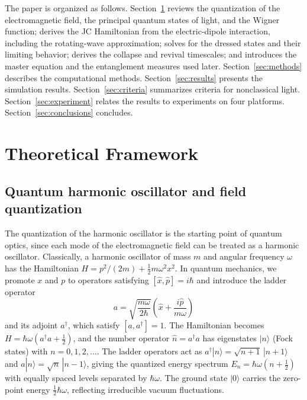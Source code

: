 \documentclass[%
 reprint,
 amsmath,amssymb,
 aps,
 floatfix,
]{revtex4-2}
\begin{document}
The paper is organized as follows. Section~\ref{sec:theory} reviews the quantization of the electromagnetic field, the principal quantum states of light, and the Wigner function; derives the JC Hamiltonian from the electric-dipole interaction, including the rotating-wave approximation; solves for the dressed states and their limiting behavior; derives the collapse and revival timescales; and introduces the master equation and the entanglement measures used later. Section~\ref{sec:methods} describes the computational methods. Section~\ref{sec:results} presents the simulation results. Section~\ref{sec:criteria} summarizes criteria for nonclassical light. Section~\ref{sec:experiment} relates the results to experiments on four platforms. Section~\ref{sec:conclusions} concludes.


\section{Theoretical Framework}
\label{sec:theory}

\subsection{Quantum harmonic oscillator and field quantization}
\label{sec:quantization}

The quantization of the harmonic oscillator is the starting point of quantum optics, since each mode of the electromagnetic field can be treated as a harmonic oscillator. Classically, a harmonic oscillator of mass $m$ and angular frequency $\omega$ has the Hamiltonian $H = p^2/(2m) + \tfrac{1}{2}m\omega^2 x^2$. In quantum mechanics, we promote $x$ and $p$ to operators satisfying $[\hat{x}, \hat{p}] = i\hbar$ and introduce the ladder operator
\begin{equation}
a = \sqrt{\frac{m\omega}{2\hbar}} \left( \hat{x} + \frac{i\hat{p}}{m\omega} \right)
\label{eq:ladder}
\end{equation}
and its adjoint $a^\dagger$, which satisfy $[a, a^\dagger] = 1$. The Hamiltonian becomes $H = \hbar\omega(a^\dagger a + \tfrac{1}{2})$, and the number operator $\hat{n} = a^\dagger a$ has eigenstates $|n\rangle$ (Fock states) with $n = 0, 1, 2, \ldots$. The ladder operators act as $a^\dagger|n\rangle = \sqrt{n+1}\,|n+1\rangle$ and $a|n\rangle = \sqrt{n}\,|n-1\rangle$, giving the quantized energy spectrum $E_n = \hbar\omega(n + \tfrac{1}{2})$ with equally spaced levels separated by $\hbar\omega$. The ground state $|0\rangle$ carries the zero-point energy $\tfrac{1}{2}\hbar\omega$, reflecting irreducible vacuum fluctuations.
\end{document}
